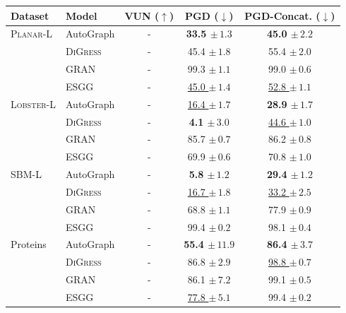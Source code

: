 \begin{tabular}{llccc}
\toprule
\textbf{Dataset} & \textbf{Model} & \textbf{VUN ($\uparrow$)} & \textbf{PGD ($\downarrow$)} & \textbf{PGD-Concat. ($\downarrow$)} \\
\midrule
\textsc{Planar-L} & AutoGraph & - & \textbf{33.5 $\pm\,\scriptstyle{1.3}$} & \textbf{45.0 $\pm\,\scriptstyle{2.2}$} \\
 & \textsc{DiGress} & - & 45.4 $\pm\,\scriptstyle{1.8}$ & 55.4 $\pm\,\scriptstyle{2.0}$ \\
 & GRAN & - & 99.3 $\pm\,\scriptstyle{1.1}$ & 99.0 $\pm\,\scriptstyle{0.6}$ \\
 & ESGG & - & \underline{45.0 $\pm\,\scriptstyle{1.4}$} & \underline{52.8 $\pm\,\scriptstyle{1.1}$} \\
\midrule
\textsc{Lobster-L} & AutoGraph & - & \underline{16.4 $\pm\,\scriptstyle{1.7}$} & \textbf{28.9 $\pm\,\scriptstyle{1.7}$} \\
 & \textsc{DiGress} & - & \textbf{4.1 $\pm\,\scriptstyle{3.0}$} & \underline{44.6 $\pm\,\scriptstyle{1.0}$} \\
 & GRAN & - & 85.7 $\pm\,\scriptstyle{0.7}$ & 86.2 $\pm\,\scriptstyle{0.8}$ \\
 & ESGG & - & 69.9 $\pm\,\scriptstyle{0.6}$ & 70.8 $\pm\,\scriptstyle{1.0}$ \\
\midrule
\textsc{SBM-L} & AutoGraph & - & \textbf{5.8 $\pm\,\scriptstyle{1.2}$} & \textbf{29.4 $\pm\,\scriptstyle{1.2}$} \\
 & \textsc{DiGress} & - & \underline{16.7 $\pm\,\scriptstyle{1.8}$} & \underline{33.2 $\pm\,\scriptstyle{2.5}$} \\
 & GRAN & - & 68.8 $\pm\,\scriptstyle{1.1}$ & 77.9 $\pm\,\scriptstyle{0.9}$ \\
 & ESGG & - & 99.4 $\pm\,\scriptstyle{0.2}$ & 98.1 $\pm\,\scriptstyle{0.4}$ \\
\midrule
Proteins & AutoGraph & - & \textbf{55.4 $\pm\,\scriptstyle{11.9}$} & \textbf{86.4 $\pm\,\scriptstyle{3.7}$} \\
 & \textsc{DiGress} & - & 86.8 $\pm\,\scriptstyle{2.9}$ & \underline{98.8 $\pm\,\scriptstyle{0.7}$} \\
 & GRAN & - & 86.1 $\pm\,\scriptstyle{7.2}$ & 99.1 $\pm\,\scriptstyle{0.5}$ \\
 & ESGG & - & \underline{77.8 $\pm\,\scriptstyle{5.1}$} & 99.4 $\pm\,\scriptstyle{0.2}$ \\
\bottomrule
\end{tabular}